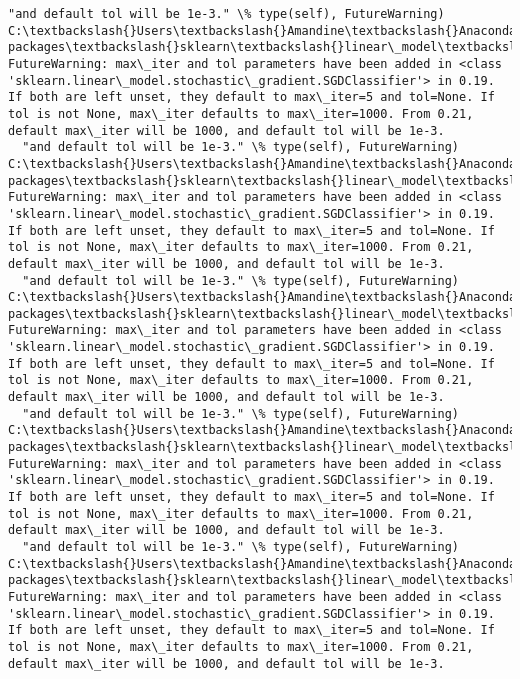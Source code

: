 \documentclass[11pt]{article}
\begin{document}
\begin{Verbatim}[commandchars=\\\{\}]
  "and default tol will be 1e-3." \% type(self), FutureWarning)
C:\textbackslash{}Users\textbackslash{}Amandine\textbackslash{}Anaconda3\textbackslash{}lib\textbackslash{}site-packages\textbackslash{}sklearn\textbackslash{}linear\_model\textbackslash{}stochastic\_gradient.py:128: FutureWarning: max\_iter and tol parameters have been added in <class 'sklearn.linear\_model.stochastic\_gradient.SGDClassifier'> in 0.19. If both are left unset, they default to max\_iter=5 and tol=None. If tol is not None, max\_iter defaults to max\_iter=1000. From 0.21, default max\_iter will be 1000, and default tol will be 1e-3.
  "and default tol will be 1e-3." \% type(self), FutureWarning)
C:\textbackslash{}Users\textbackslash{}Amandine\textbackslash{}Anaconda3\textbackslash{}lib\textbackslash{}site-packages\textbackslash{}sklearn\textbackslash{}linear\_model\textbackslash{}stochastic\_gradient.py:128: FutureWarning: max\_iter and tol parameters have been added in <class 'sklearn.linear\_model.stochastic\_gradient.SGDClassifier'> in 0.19. If both are left unset, they default to max\_iter=5 and tol=None. If tol is not None, max\_iter defaults to max\_iter=1000. From 0.21, default max\_iter will be 1000, and default tol will be 1e-3.
  "and default tol will be 1e-3." \% type(self), FutureWarning)
C:\textbackslash{}Users\textbackslash{}Amandine\textbackslash{}Anaconda3\textbackslash{}lib\textbackslash{}site-packages\textbackslash{}sklearn\textbackslash{}linear\_model\textbackslash{}stochastic\_gradient.py:128: FutureWarning: max\_iter and tol parameters have been added in <class 'sklearn.linear\_model.stochastic\_gradient.SGDClassifier'> in 0.19. If both are left unset, they default to max\_iter=5 and tol=None. If tol is not None, max\_iter defaults to max\_iter=1000. From 0.21, default max\_iter will be 1000, and default tol will be 1e-3.
  "and default tol will be 1e-3." \% type(self), FutureWarning)
C:\textbackslash{}Users\textbackslash{}Amandine\textbackslash{}Anaconda3\textbackslash{}lib\textbackslash{}site-packages\textbackslash{}sklearn\textbackslash{}linear\_model\textbackslash{}stochastic\_gradient.py:128: FutureWarning: max\_iter and tol parameters have been added in <class 'sklearn.linear\_model.stochastic\_gradient.SGDClassifier'> in 0.19. If both are left unset, they default to max\_iter=5 and tol=None. If tol is not None, max\_iter defaults to max\_iter=1000. From 0.21, default max\_iter will be 1000, and default tol will be 1e-3.
  "and default tol will be 1e-3." \% type(self), FutureWarning)
C:\textbackslash{}Users\textbackslash{}Amandine\textbackslash{}Anaconda3\textbackslash{}lib\textbackslash{}site-packages\textbackslash{}sklearn\textbackslash{}linear\_model\textbackslash{}stochastic\_gradient.py:128: FutureWarning: max\_iter and tol parameters have been added in <class 'sklearn.linear\_model.stochastic\_gradient.SGDClassifier'> in 0.19. If both are left unset, they default to max\_iter=5 and tol=None. If tol is not None, max\_iter defaults to max\_iter=1000. From 0.21, default max\_iter will be 1000, and default tol will be 1e-3.

\end{Verbatim}
\end{document}
